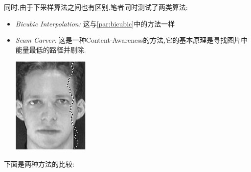 同时,由于下采样算法之间也有区别,笔者同时测试了两类算法:
\begin{itemize}
	\item \textit{Bicubic Interpolation:} 这与\ref{par:bicubic}中的方法一样
	\item \textit{Seam Carver:} 这是一种Content-Awareness的方法,它的基本原理是寻找图片中能量最低的路径并剔除.
		\begin{center}
	\begin{minipage}[t]{\linewidth}
	\center
	{
	\captionsetup{justification=centering}
	\includegraphics[width=0.3\textwidth]{Img/c4/seam_demo} 
	}
	\end{minipage}
	\medskip
	\end{center}
\end{itemize}
下面是两种方法的比较:
